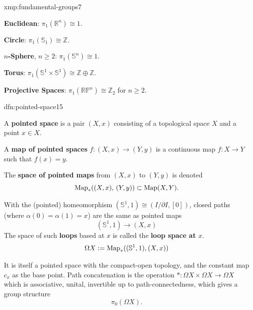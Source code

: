 \documentclass[landscape, 8pt]{extarticle}
\begin{document}
\begin{multicols*}{3}
\vspace{-7pt}
\begin{xmp}{xmp:fundamental-groups}{7}
	\vspace{-2pt}
	\begin{itemize-zero}
		\begin{multicols}{2}
	    \item \textbf{Euclidean}: $\pi_{1}(\mathbb{R}^{n}) \cong 1$.
	    \item \textbf{Circle}: $\pi_{1}(\mathbb{S}_{1}) \cong \mathbb{Z}$.
	    \item \textbf{$n$-Sphere}, $n \ge 2$: $\pi_{1}(\mathbb{S}^{n}) \cong 1$.
	    \item \textbf{Torus}: $\pi_{1}(\mathbb{S}^{1} \times \mathbb{S}^{1}) \cong \mathbb{Z} \oplus \mathbb{Z}$.
		\end{multicols}
	    \item \textbf{Projective Spaces}: $\pi_{1}(\mathbb{RP}^{n}) \cong \mathbb{Z}_{2}$ for $n \ge 2$.
	\end{itemize-zero}
\end{xmp}

\vspace{-7pt}
\begin{dfn}{dfn:pointed-space}{15}
	\vspace{-2pt}
	\begin{itemize-zero}
	    \item A \textbf{pointed space} is a pair $(X, x)$ consisting of a topological space $X$ and a point $x\in X$.
	\vspace{-2pt}
	    \item A \textbf{map of pointed spaces} $f : (X, x) \to (Y, y)$ is a continuous map $f : X \to Y$ such that $f(x) = y$.
	\vspace{-2pt}
	    \item The \textbf{space of pointed maps} from $(X, x)$ to $(Y, y)$ is denoted
			\[\operatorname{Map}_{\ast}((X, x),\, (Y, y)) \subset \operatorname{Map}(X, Y).\]
	\end{itemize-zero}
	\par\vspace{-5pt}
	With the (pointed) homeomorphism $(\mathbb{S}^{1}, 1) \cong (I /\partial I, [0])$, closed paths (where $\alpha(0) = \alpha(1) = x$) are the same as pointed maps
	\[(\mathbb{S}^{1}, 1) \to (X, x)\]
	The space of such \textbf{loops} based at $x$ is called the \textbf{loop space at $x$}.
	\[\Omega X := \operatorname{Map}_{\ast} ((\mathbb{S}^{1}, 1), (X, x))\]
	\par\vspace{-2pt}
	It is itself a pointed space with the compact-open topology, and the constant map $c_{x}$ as the base point. Path concatenation is the operation $\ast : \Omega X \times \Omega X \to \Omega X$ which is associative, unital, invertible up to path-connectedness, which gives a group structure
	\[\pi_{0}(\Omega X).\]
\end{dfn}


\end{multicols*}
\end{document}
